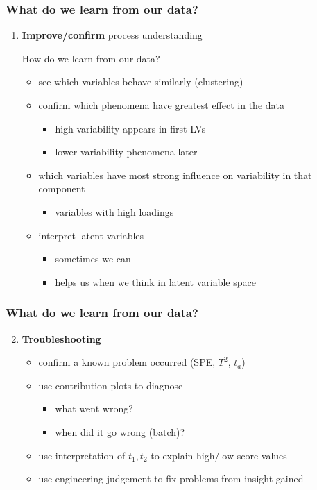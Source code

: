 \begin{frame}\frametitle{What do we learn from our data?}

\begin{enumerate}
	\item {\bf \color{myGreen}Improve/confirm} process understanding
	
		 How do we learn from our data?
\begin{itemize}

	\item	see which variables behave similarly (clustering) \pause
	\item	confirm which phenomena have greatest effect in the data 
	\begin{itemize}
		\item	high variability appears in first LVs
		\item	lower variability phenomena later
	\end{itemize}\pause

	\item	which variables have most strong influence on variability in that component
	\begin{itemize}
		\item variables with high loadings
	\end{itemize}\pause

	\item	interpret latent variables
	\begin{itemize}
		\item	sometimes we can
		\item	helps us when we think in latent variable space
	\end{itemize}
\end{itemize}
\end{enumerate}
\end{frame}

\begin{frame}\frametitle{What do we learn from our data?}

\begin{enumerate}
	\setcounter{enumi}{1}
	\item {\bf \color{myGreen}Troubleshooting}
	\begin{itemize}
		\item 	confirm a known problem occurred (SPE, \( T^2 \), \( t_a \))
		\item 	use contribution plots to diagnose
		\begin{itemize}
			\item 	what went wrong?
			\item 	when did it go wrong (batch)? 
		\end{itemize}\pause
		
		\item 	use interpretation of \( t_1, t_2 \) to explain high/low score values\pause
		\item 	use engineering judgement to fix problems from insight gained
	\end{itemize}
\end{enumerate}
\end{frame}
	
